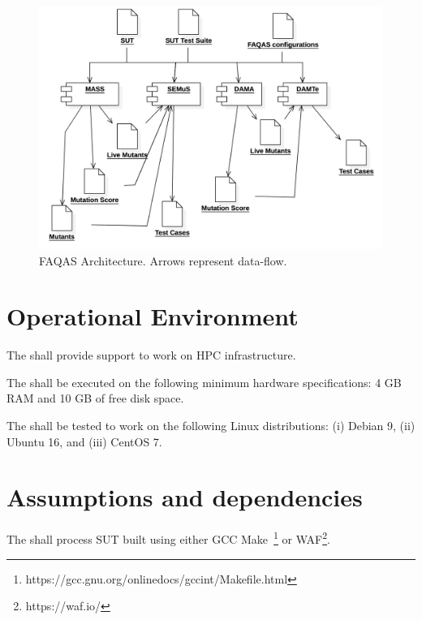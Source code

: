 \begin{figure}[h]
	\centering
		\includegraphics[width=12cm]{images/Architecture}
		\caption{FAQAS Architecture. Arrows represent data-flow.}
		\label{fig:architecture}
	\end{figure}

\clearpage
\section{Operational Environment}

\RQ{} 

\RQ{} The \FAQAS shall provide support to work on HPC infrastructure.

\RQ{} The \FAQAS shall be executed on the following minimum hardware specifications: 4 GB RAM and 10 GB of free disk space.


\RQ{} The \FAQAS shall be tested to work on the following Linux distributions: (i) Debian 9, (ii) Ubuntu 16, and (iii) CentOS 7.



\section{Assumptions and dependencies}

\RQ{} The \FAQAS shall process SUT built using either GCC Make~\footnote{https://gcc.gnu.org/onlinedocs/gccint/Makefile.html} or WAF\footnote{https://waf.io/}.


